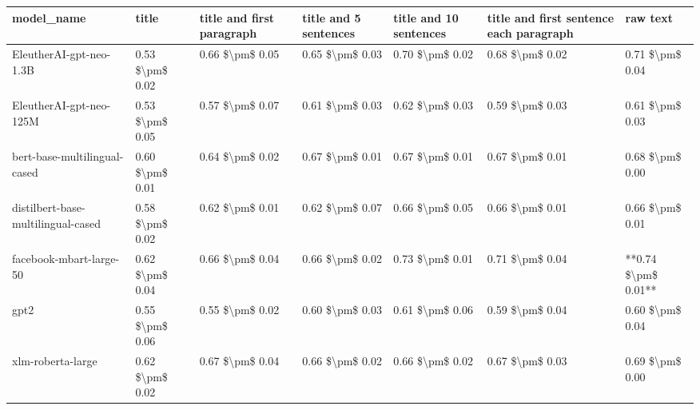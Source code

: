 \begin{tabular}{lllllll}
\toprule
                        model\_name &           title & title and first paragraph & title and 5 sentences & title and 10 sentences & title and first sentence each paragraph &            raw text \\
\midrule
           EleutherAI-gpt-neo-1.3B & 0.53 \$\textbackslash pm\$ 0.02 &           0.66 \$\textbackslash pm\$ 0.05 &       0.65 \$\textbackslash pm\$ 0.03 &        0.70 \$\textbackslash pm\$ 0.02 &                         0.68 \$\textbackslash pm\$ 0.02 &     0.71 \$\textbackslash pm\$ 0.04 \\
           EleutherAI-gpt-neo-125M & 0.53 \$\textbackslash pm\$ 0.05 &           0.57 \$\textbackslash pm\$ 0.07 &       0.61 \$\textbackslash pm\$ 0.03 &        0.62 \$\textbackslash pm\$ 0.03 &                         0.59 \$\textbackslash pm\$ 0.03 &     0.61 \$\textbackslash pm\$ 0.03 \\
      bert-base-multilingual-cased & 0.60 \$\textbackslash pm\$ 0.01 &           0.64 \$\textbackslash pm\$ 0.02 &       0.67 \$\textbackslash pm\$ 0.01 &        0.67 \$\textbackslash pm\$ 0.01 &                         0.67 \$\textbackslash pm\$ 0.01 &     0.68 \$\textbackslash pm\$ 0.00 \\
distilbert-base-multilingual-cased & 0.58 \$\textbackslash pm\$ 0.02 &           0.62 \$\textbackslash pm\$ 0.01 &       0.62 \$\textbackslash pm\$ 0.07 &        0.66 \$\textbackslash pm\$ 0.05 &                         0.66 \$\textbackslash pm\$ 0.01 &     0.66 \$\textbackslash pm\$ 0.01 \\
           facebook-mbart-large-50 & 0.62 \$\textbackslash pm\$ 0.04 &           0.66 \$\textbackslash pm\$ 0.04 &       0.66 \$\textbackslash pm\$ 0.02 &        0.73 \$\textbackslash pm\$ 0.01 &                         0.71 \$\textbackslash pm\$ 0.04 & **0.74 \$\textbackslash pm\$ 0.01** \\
                              gpt2 & 0.55 \$\textbackslash pm\$ 0.06 &           0.55 \$\textbackslash pm\$ 0.02 &       0.60 \$\textbackslash pm\$ 0.03 &        0.61 \$\textbackslash pm\$ 0.06 &                         0.59 \$\textbackslash pm\$ 0.04 &     0.60 \$\textbackslash pm\$ 0.04 \\
                 xlm-roberta-large & 0.62 \$\textbackslash pm\$ 0.02 &           0.67 \$\textbackslash pm\$ 0.04 &       0.66 \$\textbackslash pm\$ 0.02 &        0.66 \$\textbackslash pm\$ 0.02 &                         0.67 \$\textbackslash pm\$ 0.03 &     0.69 \$\textbackslash pm\$ 0.00 \\
\bottomrule
\end{tabular}
